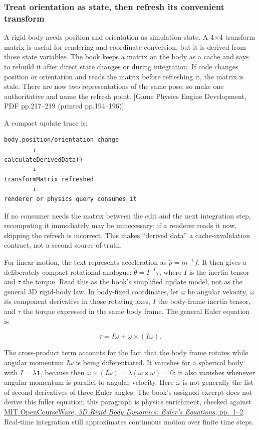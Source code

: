 \subsubsection{Treat orientation as state, then refresh its convenient transform}\label{06-engine-ii-ch033-treat-orientation-as-state-then-refresh-its-convenient-transform}

A rigid body needs position and orientation as simulation state. A 4×4 transform matrix is useful for rendering and coordinate conversion, but it is derived from those state variables. The book keeps a matrix on the body as a cache and says to rebuild it after direct state changes or during integration. If code changes position or orientation and reads the matrix before refreshing it, the matrix is stale. There are now two representations of the same pose, so make one authoritative and name the refresh point. {[}Game Physics Engine Development, PDF pp.217--219 (printed pp.194--196){]}

A compact update trace is:

\begin{verbatim}
body.position/orientation change
        ↓
calculateDerivedData()
        ↓
transformMatrix refreshed
        ↓
renderer or physics query consumes it
\end{verbatim}

If no consumer needs the matrix between the edit and the next integration step, recomputing it immediately may be unnecessary; if a renderer reads it now, skipping the refresh is incorrect. This makes ``derived data'' a cache-invalidation contract, not a second source of truth.

For linear motion, the text represents acceleration as \(\ddot{p}=m^{-1}f\). It then gives a deliberately compact rotational analogue: \(\ddot{\theta}=I^{-1}\tau\), where \(I\) is the inertia tensor and \(\tau\) the torque. Read this as the book's simplified update model, not as the general 3D rigid-body law. In body-fixed coordinates, let \(\omega\) be angular velocity, \(\dot{\omega}\) its component derivative in those rotating axes, \(I\) the body-frame inertia tensor, and \(\tau\) the torque expressed in the same body frame. The general Euler equation is

\[
\tau=I\dot{\omega}+\omega\times(I\omega).
\]

The cross-product term accounts for the fact that the body frame rotates while angular momentum \(I\omega\) is being differentiated. It vanishes for a spherical body with \(I=\lambda\mathbf{1}\), because then \(\omega\times(I\omega)=\lambda(\omega\times\omega)=0\); it also vanishes whenever angular momentum is parallel to angular velocity. Here \(\dot{\omega}\) is not generally the list of second derivatives of three Euler angles. The book's assigned excerpt does not derive this fuller equation; this paragraph is physics enrichment, checked against \href{https://ocw.mit.edu/courses/16-07-dynamics-fall-2009/5e1d8699338146e5127080b880b906d6_MIT16_07F09_Lec28.pdf}{MIT OpenCourseWare, \emph{3D Rigid Body Dynamics: Euler's Equations}, pp.~1--2}. Real-time integration still approximates continuous motion over finite time steps.

